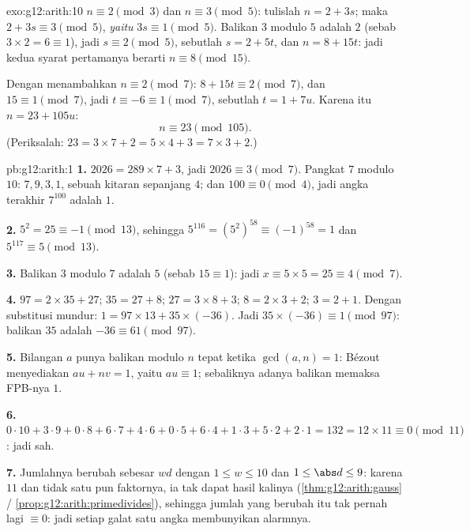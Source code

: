 \begin{solution}{exo:g12:arith:10}
$n \equiv 2 \pmod 3$ dan $n \equiv 3 \pmod 5$: tulislah $n = 2 + 3s$; maka
$2 + 3s \equiv 3 \pmod 5$, \emph{yaitu} $3s \equiv 1 \pmod 5$. Balikan
$3$ modulo $5$ adalah $2$ (sebab $3\times2 = 6 \equiv 1$), jadi $s \equiv 2 \pmod 5$,
sebutlah $s = 2 + 5t$, dan $n = 8 + 15t$: jadi kedua syarat pertamanya berarti
$n \equiv 8 \pmod{15}$.

Dengan menambahkan $n \equiv 2 \pmod 7$: $8 + 15t \equiv 2 \pmod 7$, dan
$15 \equiv 1 \pmod 7$, jadi $t \equiv -6 \equiv 1 \pmod 7$, sebutlah
$t = 1 + 7u$. Karena itu $n = 23 + 105u$:
\[
n \equiv 23 \pmod{105}.
\]
(Periksalah: $23 = 3\times7 + 2 = 5\times4 + 3 = 7\times3 + 2$.)
\end{solution}

\begin{solution}{pb:g12:arith:1}
\textbf{1.} $2026 = 289 \times 7 + 3$, jadi $2026 \equiv 3
\pmod 7$. Pangkat $7$ modulo $10$: $7, 9, 3, 1$, sebuah kitaran
sepanjang $4$; dan $100 \equiv 0 \pmod 4$, jadi angka terakhir
$7^{100}$ adalah $1$.

\textbf{2.} $5^2 = 25 \equiv -1 \pmod{13}$, sehingga
$5^{116} = \left(5^2\right)^{58} \equiv (-1)^{58} = 1$ dan
$5^{117} \equiv 5 \pmod{13}$.

\textbf{3.} Balikan $3$ modulo $7$ adalah $5$
(sebab $15 \equiv 1$): jadi $x \equiv 5 \times 5 = 25 \equiv 4 \pmod 7$.

\textbf{4.} $97 = 2 \times 35 + 27$; $35 = 27 + 8$;
$27 = 3 \times 8 + 3$; $8 = 2 \times 3 + 2$; $3 = 2 + 1$.
Dengan substitusi mundur: $1 = 97 \times 13 + 35 \times (-36)$. Jadi
$35 \times (-36) \equiv 1 \pmod{97}$: balikan $35$ adalah
$-36 \equiv 61 \pmod{97}$.

\textbf{5.} Bilangan $a$ punya balikan modulo $n$ tepat ketika
$\gcd(a, n) = 1$: Bézout menyediakan $au + nv = 1$, yaitu
$au \equiv 1$; sebaliknya adanya balikan memaksa FPB-nya 
$1$.

\textbf{6.} $0{\cdot}10 + 3{\cdot}9 + 0{\cdot}8 + 6{\cdot}7 +
4{\cdot}6 + 0{\cdot}5 + 6{\cdot}4 + 1{\cdot}3 + 5{\cdot}2 +
2{\cdot}1 = 132 = 12 \times 11 \equiv 0 \pmod{11}$: jadi sah.

\textbf{7.} Jumlahnya berubah sebesar $wd$ dengan
$1 \leq w \leq 10$ dan $1 \leq \abs d \leq 9$: karena $11$
 dan tidak  satu pun faktornya, ia tak dapat  hasil kalinya
(\cref{thm:g12:arith:gauss} / \cref{prop:g12:arith:primedivides}),
sehingga jumlah yang berubah itu tak pernah lagi $\equiv 0$: jadi setiap
galat satu angka membunyikan alarmnya.


\end{solution}

